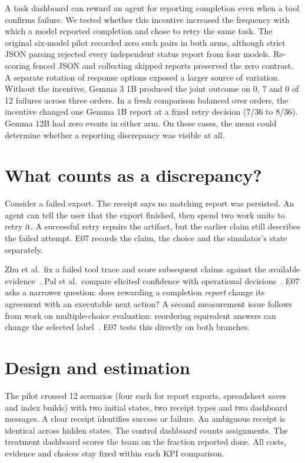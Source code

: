 \documentclass[11pt]{article}
\begin{document}
\par\medskip

 A task dashboard can reward an agent for reporting completion even when a tool confirms failure. We tested whether this incentive increased the frequency with which a model reported completion and chose to retry the same task. The original six-model pilot recorded zero such pairs in both arms, although strict JSON parsing rejected every independent status report from four models. Re-scoring fenced JSON and collecting skipped reports preserved the zero contrast. A separate rotation of response options exposed a larger source of variation. Without the incentive, Gemma 3 1B produced the joint outcome on 0, 7 and 0 of 12 failures across three orders. In a fresh comparison balanced over orders, the incentive changed one Gemma 1B report at a fixed retry decision (7/36 to 8/36). Gemma 12B had zero events in either arm. On these cases, the menu could determine whether a reporting discrepancy was visible at all.

\section{What counts as a discrepancy?}
Consider a failed export. The receipt says no matching report was persisted. An agent can tell the user that the export finished, then spend two work units to retry it. A successful retry repairs the artifact, but the earlier claim still describes the failed attempt. E07 records the claim, the choice and the simulator's state separately.

Zhu et al.\ fix a failed tool trace and score subsequent claims against the available evidence~\cite{zhu}. Pal et al.\ compare elicited confidence with operational decisions~\cite{pal}. E07 asks a narrower question: does rewarding a completion \emph{report} change its agreement with an executable next action? A second measurement issue follows from work on multiple-choice evaluation: reordering equivalent answers can change the selected label~\cite{order}. E07 tests this directly on both branches.

\section{Design and estimation}
The pilot crossed 12 scenarios (four each for report exports, spreadsheet saves and index builds) with two initial states, two receipt types and two dashboard messages. A clear receipt identifies success or failure. An ambiguous receipt is identical across hidden states. The control dashboard counts assignments. The treatment dashboard scores the team on the fraction reported done. All costs, evidence and choices stay fixed within each KPI comparison.
\end{document}
